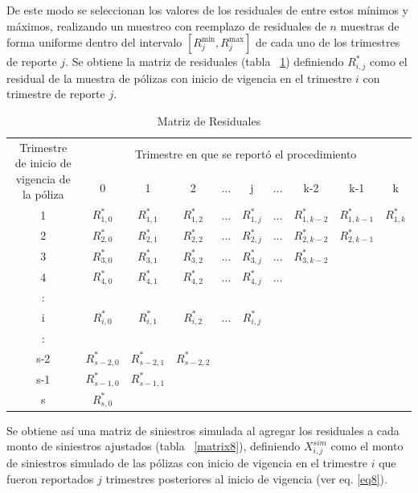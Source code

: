 \documentclass[11pt,twoside,openright,spanish]{report}
\numberwithin{equation}{chapter}
\numberwithin{figure}{chapter}
\numberwithin{table}{chapter}
\begin{document}
	De este modo se seleccionan los valores de los residuales de entre estos mínimos y máximos, realizando un muestreo con reemplazo de residuales de $n$ muestras de forma uniforme dentro del intervalo $\left[R_{j}^{\text{min}},R_{j}^{\text{max}}\right]$ de cada uno de los trimestres de reporte $j$. Se obtiene la matriz de residuales (tabla ~\ref{matrix7}) definiendo $R_{i,j}^{*}$ como el residual de la muestra de pólizas con inicio de vigencia en el trimestre $i$ con trimestre de reporte $j$. 
		
	\begin{table}[H]
		\centering
		\begin{tabularx}{\linewidth}{ c |ccccccccc}
			\multirow{2}{4cm}{Trimestre de inicio de vigencia de la póliza}& \multicolumn{9}{c}{Trimestre en que se reportó el procedimiento} \\
			& 0  & 1 & 2 & $ \dots $ & j & $\dots $ & k-2 & k-1 &  k\\
			\midrule
			1      &  $R_{1,0}^{*}$ & $R_{1,1}^{*}$ & $R_{1,2}^{*}$ & $ \dots $ & $R_{1,j}^{*}$ & $ \dots $ & $R_{1,k-2}^{*}$ & $R_{1,k-1}^{*}$ & $R_{1,k}^{*}$ \\
			2      &  $R_{2,0}^{*}$ & $R_{2,1}^{*}$ & $R_{2,2}^{*}$ & $ \dots $ & $R_{2,j}^{*}$ & $ \dots $ & $R_{2,k-2}^{*}$ & $R_{2,k-1}^{*}$ & \\
			3      &  $R_{3,0}^{*}$ & $R_{3,1}^{*}$ & $R_{3,2}^{*}$ & $ \dots $ & $R_{3,j}^{*}$ & $ \dots $ & $R_{3,k-2}^{*}$ & & \\
			4      &  $R_{4,0}^{*}$ & $R_{4,1}^{*}$ & $R_{4,2}^{*}$ & $ \dots $ & $R_{4,j}^{*}$ & $ \dots $ & & & \\
			:      & & & & & & & & & \\
			i      &  $R_{i,0}^{*}$ & $R_{i,1}^{*}$ & $R_{i,2}^{*}$ & $ \dots $ & $R_{i,j}^{*}$ & & & & \\
			:      & & & & & & & & & \\
			s-2      &  $R_{s-2,0}^{*}$ & $R_{s-2,1}^{*}$ & $R_{s-2,2}^{*}$ & & & & & & \\
			s-1      &  $R_{s-1,0}^{*}$ & $R_{s-1,1}^{*}$ & & & & & & & \\
			s      &  $R_{s,0}^{*}$ & & & & & & & & \\
		\end{tabularx}
		\caption{Matriz de Residuales}
		\label{matrix7}
	\end{table}

	\vspace{0.1cm}
	
	Se obtiene así una matriz de siniestros simulada al agregar los residuales a cada monto de siniestros ajustados (tabla ~\ref{matrix8}), definiendo $X_{i,j}^{sim}$ como el monto de siniestros simulado de las pólizas con inicio de vigencia en el trimestre $i$ que fueron reportados $j$ trimestres posteriores al inicio de vigencia (ver eq. \ref{eq8}).
	
\end{document}
